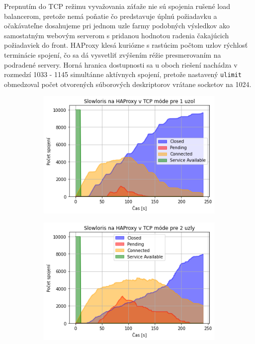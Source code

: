 \documentclass[12pt, a4paper]{article}
\begin{document}
Prepnutím do TCP režimu vyvažovania záťaže nie sú spojenia rušené load balancerom, pretože nemá
poňatie čo predstavuje úplnú požiadavku a očakávateľne dosahujeme pri jednom uzle farmy podobných
výsledkov ako samostatným webovým serverom s pridanou hodnotou radenia čakajúcich požiadaviek do front.
HAProxy klesá kuriózne s rastúcim počtom uzlov rýchlosť terminácie spojení, čo sa dá vysvetliť zvýšením
réžie presmerovaním na podradené servery. Horná hranica dostupnosti sa u oboch riešení nachádza v rozmedzí
1033 - 1145 simultánne aktívnych spojení, pretože nastavený \verb|ulimit| obmedzoval počet otvorených 
súborových deskriptorov vrátane socketov na 1024.

\begin{figure}[h!]
	\centering
	\begin{subfigure}[t]{.32\textwidth}
  		\centering
  		\includegraphics[width=\textwidth]{images/haproxy-1-tcp.png}
	\end{subfigure}
	\begin{subfigure}[t]{.32\textwidth}
  		\centering
  		\includegraphics[width=\textwidth]{images/haproxy-2-tcp.png}

\end{subfigure}
\end{figure}
\end{document}
